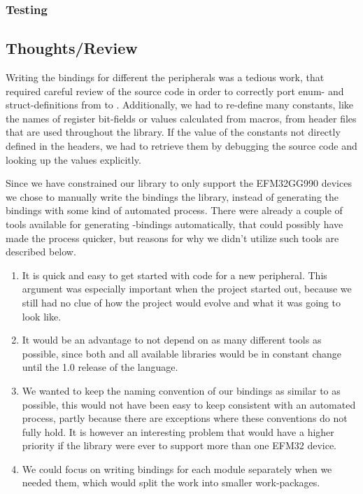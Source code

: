 
\subsubsection{Testing}



\subsection{Thoughts/Review}

Writing the bindings for different the peripherals was a tedious work, that required careful review
of the \emlib source code in order to correctly port enum- and struct-definitions from \C to \rust.
Additionally, we had to re-define many constants, like the names of register bit-fields or values
calculated from \C macros, from header files that are used throughout the library. If the value of
the constants not directly defined in the headers, we had to retrieve them by debugging the source
code and looking up the values explicitly.

Since we have constrained our library to only support the EFM32GG990 devices we chose to manually
write the bindings the library, instead of generating the bindings with some kind of automated
process. There were already a couple of tools available for generating \C-bindings automatically,
that could possibly have made the process quicker, but reasons for why we didn't utilize such tools
are described below.

\begin{enumerate}
    \item It is quick and easy to get started with code for a new peripheral. This argument was
    especially important when the project started out, because we still had no clue of how the
    project would evolve and what it was going to look like.
    \item It would be an advantage to not depend on as many different tools as possible, since both
    \rust and all available libraries would be in constant change until the 1.0 release of the
    language.
    \item We wanted to keep the naming convention of our bindings as similar to \emlib as possible,
    this would not have been easy to keep consistent with an automated process, partly because there
    are exceptions where these conventions do not fully hold. It is however an interesting problem
    that would have a higher priority if the library were ever to support more than one EFM32
    device.
    \item We could focus on writing bindings for each module separately when we needed them, which
    would split the work into smaller work-packages.
\end{enumerate}
